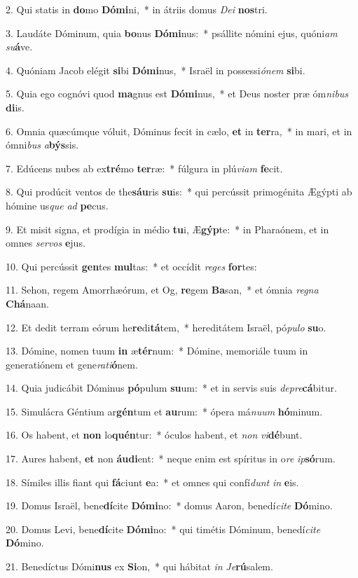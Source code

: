 2. Qui statis in \textbf{do}mo \textbf{Dó}\textbf{mi}ni,~*  in átriis domus \textit{De}\textit{i} \textbf{nos}tri.\

3. Laudáte Dóminum, quia \textbf{bo}nus \textbf{Dó}\textbf{mi}nus:~*  psállite nómini ejus, quóni\textit{am} \textit{su}\textbf{á}ve.\

4. Quóniam Jacob elégit \textbf{si}bi \textbf{Dó}\textbf{mi}nus,~*  Israël in possessi\textit{ó}\textit{nem} \textbf{si}bi.\

5. Quia ego cognóvi quod \textbf{ma}gnus est \textbf{Dó}\textbf{mi}nus,~*  et Deus noster præ óm\textit{ni}\textit{bus} \textbf{di}is.\

6. Omnia quæcúmque vóluit, Dóminus fecit in cælo, \textbf{et} in \textbf{ter}ra,~*  in mari, et in ómni\textit{bus} \textit{a}\textbf{býs}sis.\

7. Edúcens nubes ab ex\textbf{tré}mo \textbf{ter}ræ:~*  fúlgura in plú\textit{vi}\textit{am} \textbf{fe}cit.\

8. Qui prodúcit ventos de the\textbf{sáu}ris \textbf{su}is:~*  qui percússit primogénita Ægýpti ab hómine us\textit{que} \textit{ad} \textbf{pe}cus.\

9. Et misit signa, et prodígia in médio \textbf{tu}i, Æ\textbf{gýp}te:~*  in Pharaónem, et in omnes \textit{ser}\textit{vos} \textbf{e}jus.\

10. Qui percússit \textbf{gen}tes \textbf{mul}tas:~*  et occídit \textit{re}\textit{ges} \textbf{for}tes:\

11. Sehon, regem Amorrhæórum, et Og, \textbf{re}gem \textbf{Ba}san,~*  et ómnia \textit{re}\textit{gna} \textbf{Chá}naan.\

12. Et dedit terram eórum he\textbf{re}di\textbf{tá}tem,~*  hereditátem Israël, pó\textit{pu}\textit{lo} \textbf{su}o.\

13. Dómine, nomen tuum \textbf{in} æ\textbf{tér}num:~*  Dómine, memoriále tuum in generatiónem et gene\textit{ra}\textit{ti}\textbf{ó}nem.\

14. Quia judicábit Dóminus \textbf{pó}pulum \textbf{su}um:~*  et in servis suis \textit{de}\textit{pre}\textbf{cá}bitur.\

15. Simulácra Géntium ar\textbf{gén}tum et \textbf{au}rum:~*  ópera má\textit{nu}\textit{um} \textbf{hó}minum.\

16. Os habent, et \textbf{non} lo\textbf{quén}tur:~*  óculos habent, et \textit{non} \textit{vi}\textbf{dé}bunt.\

17. Aures habent, \textbf{et} non \textbf{áu}\textbf{di}ent:~*  neque enim est spíritus in o\textit{re} \textit{ip}\textbf{só}rum.\

18. Símiles illis fiant qui \textbf{fá}ciunt \textbf{e}a:~*  et omnes qui confí\textit{dunt} \textit{in} \textbf{e}is.\

19. Domus Israël, bene\textbf{dí}cite \textbf{Dó}\textbf{mi}no:~*  domus Aaron, benedí\textit{ci}\textit{te} \textbf{Dó}mino.\

20. Domus Levi, bene\textbf{dí}cite \textbf{Dó}\textbf{mi}no:~*  qui timétis Dóminum, benedí\textit{ci}\textit{te} \textbf{Dó}mino.\

21. Benedíctus Dómi\textbf{nus} ex \textbf{Si}on,~*  qui hábitat \textit{in} \textit{Je}\textbf{rú}salem.\

